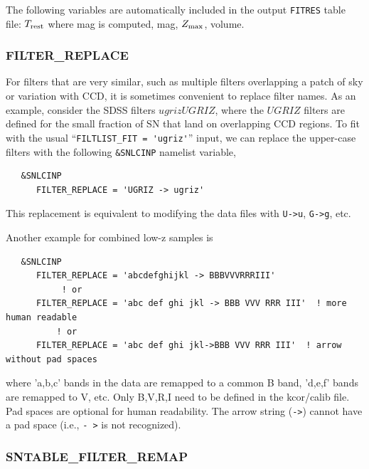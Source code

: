 \documentclass[12pt]{article}
\newcommand{\Trest}{T_{\rm rest}}
\newcommand{\zmax}{Z_{\rm max}}
\begin{document}
The following variables are automatically included in the output
{\tt FITRES} table file:
$\Trest$ where mag is computed, mag, $\zmax$, volume.


  \clearpage
  \subsubsection{FILTER\_REPLACE}
  \label{sss:filter_replace}

For filters that are very similar, such as multiple filters
overlapping a patch of sky or variation with CCD, it is sometimes convenient
to replace filter names. As an example, consider the SDSS filters
$ugrizUGRIZ$, where the $UGRIZ$ filters are defined for the 
small fraction of SN that land on overlapping CCD regions. 
To fit with the usual ``\verb|FILTLIST_FIT = 'ugriz'|'' input,
we can replace the upper-case filters with the
following {\tt \&SNLCINP} namelist variable,
%
\begin{verbatim}
   &SNLCINP
      FILTER_REPLACE = 'UGRIZ -> ugriz'
\end{verbatim}
%
This replacement is equivalent to modifying the data
files with {\tt U->u}, {\tt G->g}, etc.

Another example for combined low-z samples is
\begin{verbatim} 
   &SNLCINP
      FILTER_REPLACE = 'abcdefghijkl -> BBBVVVRRRIII'
           ! or
      FILTER_REPLACE = 'abc def ghi jkl -> BBB VVV RRR III'  ! more human readable
          ! or 
      FILTER_REPLACE = 'abc def ghi jkl->BBB VVV RRR III'  ! arrow without pad spaces
\end{verbatim}
% 
where 'a,b,c' bands in the data are remapped to a common B band,
'd,e,f' bands are remapped to V, etc.
Only B,V,R,I need to be defined in the kcor/calib file. Pad spaces are 
optional for human readability. The arrow string (\verb|->|)
cannot have a pad space (i.e., \verb|- >| is not recognized).

  \subsubsection{SNTABLE\_FILTER\_REMAP}
  \label{sss:filter_remap}
\end{document}

